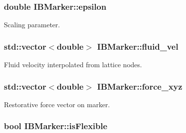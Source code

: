 \subsubsection[{\texorpdfstring{epsilon}{epsilon}}]{\setlength{\rightskip}{0pt plus 5cm}double I\+B\+Marker\+::epsilon\hspace{0.3cm}{\ttfamily [protected]}}\hypertarget{class_i_b_marker_a8127c61f723299ba0bf04439c1fb1c1e}{}\label{class_i_b_marker_a8127c61f723299ba0bf04439c1fb1c1e}


Scaling parameter. 

\subsubsection[{\texorpdfstring{fluid\+\_\+vel}{fluid_vel}}]{\setlength{\rightskip}{0pt plus 5cm}std\+::vector$<$double$>$ I\+B\+Marker\+::fluid\+\_\+vel\hspace{0.3cm}{\ttfamily [protected]}}\hypertarget{class_i_b_marker_aa31ccf45de61bfccc60876ac9e98909a}{}\label{class_i_b_marker_aa31ccf45de61bfccc60876ac9e98909a}


Fluid velocity interpolated from lattice nodes. 

\subsubsection[{\texorpdfstring{force\+\_\+xyz}{force_xyz}}]{\setlength{\rightskip}{0pt plus 5cm}std\+::vector$<$double$>$ I\+B\+Marker\+::force\+\_\+xyz\hspace{0.3cm}{\ttfamily [protected]}}\hypertarget{class_i_b_marker_aa8b8b23e64a8bfc4051b95ebf9ccb767}{}\label{class_i_b_marker_aa8b8b23e64a8bfc4051b95ebf9ccb767}


Restorative force vector on marker. 

\subsubsection[{\texorpdfstring{is\+Flexible}{isFlexible}}]{\setlength{\rightskip}{0pt plus 5cm}bool I\+B\+Marker\+::is\+Flexible\hspace{0.3cm}{\ttfamily [protected]}}\hypertarget{class_i_b_marker_a190d90424dc97a7d83669f81dd8273a8}{}\label{class_i_b_marker_a190d90424dc97a7d83669f81dd8273a8}



